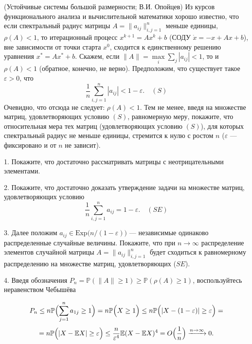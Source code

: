 \begin{problem}(Устойчивые системы большой размерности; В.И. Опойцев)
Из курсов функционального анализа и вычислительной математики хорошо известно, что если спектральный радиус матрицы 
$A=\| a_{ij}\|_{i,j=1}^{n}$ меньше единицы, $\rho(A)<1$, то итерационный процесс $x^{k+1}=A x^k + b$ 
(СОДУ $\dot{x}=-x+A x+ b$), вне зависимости от точки старта $x^0$, 
сходится к единственному решению уравнения $x^*=Ax^*+ b$. 
Скажем, если $\| A\|=\max\limits_{i} \sum\limits_j |a_{ij}|<1$, то и $\rho(A)<1$ (обратное, конечно, не верно). Предположим, что 
существует такое $\varepsilon>0$, что 
$$
\frac{1}{n}\sum\limits_{i,j=1}^n |a_{ij}|<1-\varepsilon . 
\quad (S)
$$
Очевидно, что отсюда не следует: $\rho(A)<1$. 
Тем не менее, введя на множестве матриц, удовлетворяющих условию $(S)$, равномерную меру, покажите, что относительная мера тех матриц 
(удовлетворяющих условию $(S)$), для которых спектральный радиус не меньше единицы, стремится к нулю 
с ростом $n$ ($\varepsilon$ --- фиксировано и от $n$ не зависит). 
\end{problem}
\begin{ordre}

1. Покажите, что  достаточно рассматривать матрицы с неотрицательными элементами. 

2.  Покажите, что достаточно доказать утверждение задачи на множестве матриц, удовлетворяющих условию 
$$
\frac{1}{n}\sum\limits_{i,j=1}^n a_{ij}=1-\varepsilon . 
\quad (SE)
$$

3. Далее положим $a_{ij}\in \mathrm{Exp} \bigl( n/(1-\varepsilon)\bigr)$ --- независимые одинаково распределенные случайные величины. Покажите, что при $n\to\infty$ распределение элементов случайной матрицы $A=\| a_{ij}\|_{i,j=1}^n$ 
будет сходиться к равномерному распределению на множестве матриц, удовлетворяющих ($SE$). 

4. Введя обозначения
$P_n={\mathbb P}(\| A\|\ge 1)\ge {\mathbb P}(\rho(A)\ge 1)$, воспользуйтесь неравенством Чебышёва

$$
P_n\le n {\mathbb P}\Bigl( \sum\limits_{j=1}^n a_{1j}\ge 1 \Bigr)=n {\mathbb P}\Bigl( X\ge 1 \Bigr)\le 
n {\mathbb P}\Bigl( |X-(1-\varepsilon)|\ge \varepsilon \Bigr)=
$$
$$
=n {\mathbb P}\Bigl( |X-{\mathbb E}X|\ge \varepsilon \Bigr)\le \frac{n}{\varepsilon^4} {\mathbb E}(X-{\mathbb E}X)^4=
O\Bigl(\frac{1}{n}\Bigr) \xrightarrow{n\to\infty} 0 . 
$$
\end{ordre}



